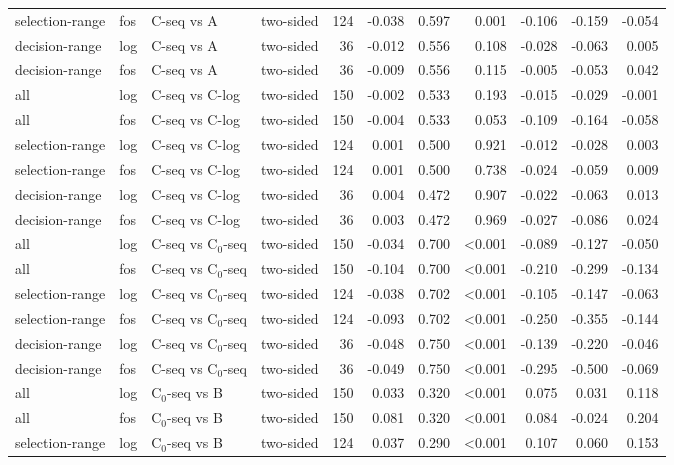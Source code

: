 \begin{longtable}{llllrrrrrrr}
selection-range & fos & C-seq vs A & two-sided & 124 & -0.038 & 0.597 & 0.001 & -0.106 & -0.159 & -0.054 \\
decision-range & log & C-seq vs A & two-sided & 36 & -0.012 & 0.556 & 0.108 & -0.028 & -0.063 & 0.005 \\
decision-range & fos & C-seq vs A & two-sided & 36 & -0.009 & 0.556 & 0.115 & -0.005 & -0.053 & 0.042 \\
all & log & C-seq vs C-log & two-sided & 150 & -0.002 & 0.533 & 0.193 & -0.015 & -0.029 & -0.001 \\
all & fos & C-seq vs C-log & two-sided & 150 & -0.004 & 0.533 & 0.053 & -0.109 & -0.164 & -0.058 \\
selection-range & log & C-seq vs C-log & two-sided & 124 & 0.001 & 0.500 & 0.921 & -0.012 & -0.028 & 0.003 \\
selection-range & fos & C-seq vs C-log & two-sided & 124 & 0.001 & 0.500 & 0.738 & -0.024 & -0.059 & 0.009 \\
decision-range & log & C-seq vs C-log & two-sided & 36 & 0.004 & 0.472 & 0.907 & -0.022 & -0.063 & 0.013 \\
decision-range & fos & C-seq vs C-log & two-sided & 36 & 0.003 & 0.472 & 0.969 & -0.027 & -0.086 & 0.024 \\
all & log & C-seq vs C$_0$-seq & two-sided & 150 & -0.034 & 0.700 & <0.001 & -0.089 & -0.127 & -0.050 \\
all & fos & C-seq vs C$_0$-seq & two-sided & 150 & -0.104 & 0.700 & <0.001 & -0.210 & -0.299 & -0.134 \\
selection-range & log & C-seq vs C$_0$-seq & two-sided & 124 & -0.038 & 0.702 & <0.001 & -0.105 & -0.147 & -0.063 \\
selection-range & fos & C-seq vs C$_0$-seq & two-sided & 124 & -0.093 & 0.702 & <0.001 & -0.250 & -0.355 & -0.144 \\
decision-range & log & C-seq vs C$_0$-seq & two-sided & 36 & -0.048 & 0.750 & <0.001 & -0.139 & -0.220 & -0.046 \\
decision-range & fos & C-seq vs C$_0$-seq & two-sided & 36 & -0.049 & 0.750 & <0.001 & -0.295 & -0.500 & -0.069 \\
all & log & C$_0$-seq vs B & two-sided & 150 & 0.033 & 0.320 & <0.001 & 0.075 & 0.031 & 0.118 \\
all & fos & C$_0$-seq vs B & two-sided & 150 & 0.081 & 0.320 & <0.001 & 0.084 & -0.024 & 0.204 \\
selection-range & log & C$_0$-seq vs B & two-sided & 124 & 0.037 & 0.290 & <0.001 & 0.107 & 0.060 & 0.153 \\

\end{longtable}
